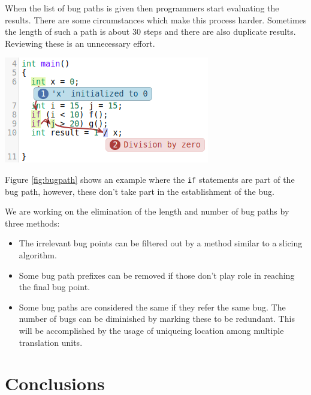 \documentclass[a0,portrait]{a0poster}
\begin{document}
\begin{multicols}{2}
When the list of bug paths is given then programmers start evaluating the 
results. There are some circumstances which make this process harder. Sometimes 
the length of such a path is about 30 steps and there are also duplicate 
results. Reviewing these is an unnecessary effort.

\begin{center}\vspace{1cm}
  \includegraphics[width=0.5\linewidth]{bugpath}
  \label{fig:bugpath}
\end{center}\vspace{1cm}

Figure \ref{fig:bugpath} shows an example where the \texttt{if} statements are 
part of the bug path, however, these don't take part in the establishment of 
the bug.

We are working on the elimination of the length and number of bug paths by 
three methods:
\begin{itemize}
  \item The irrelevant bug points can be filtered out by a method similar to a 
  slicing algorithm.
  \item Some bug path prefixes can be removed if those don't play role in 
  reaching the final bug point.
  \item Some bug paths are considered the same if they refer the same bug. The 
  number of bugs can be diminished by marking these to be redundant. This will 
  be accomplished by the usage of uniqueing location among multiple translation 
  units.
\end{itemize}



\color{SaddleBrown} %

\section*{Conclusions}


\end{multicols}
\end{document}
